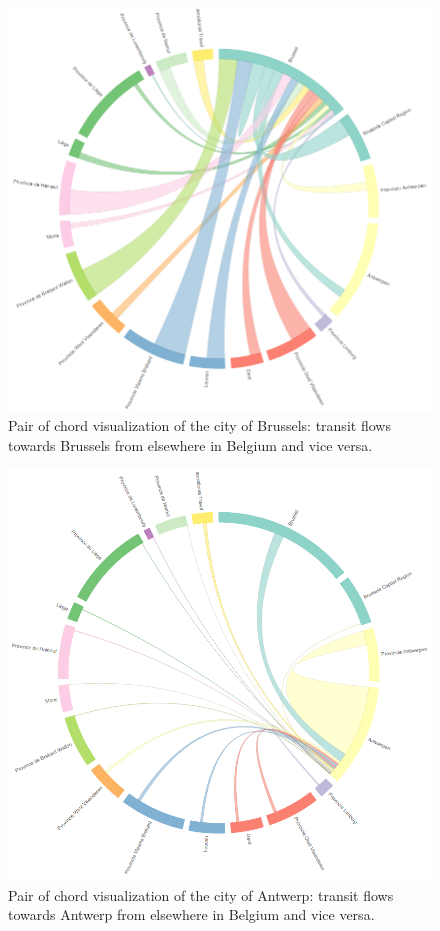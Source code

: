 \documentclass{sig-alternate}
\begin{document}
\begin{figure}
\centering
\includegraphics[width=15cm]{brussels}
\caption{Pair of chord visualization of the city of Brussels: transit flows towards Brussels from elsewhere in Belgium and vice versa.}
\label{fig:brussels}
\end{figure}

\begin{figure}
\centering
\includegraphics[width=15cm]{antwerp}
\caption{Pair of chord visualization of the city of Antwerp: transit flows towards Antwerp from elsewhere in Belgium and vice versa.}
\label{fig:antwerp}
\end{figure}
\end{document}
